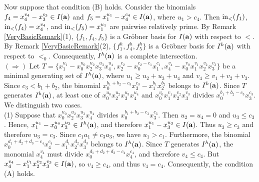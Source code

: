 \documentclass[10pt]{amsart}
\begin{document}
Now suppose that condition (B) holds. Consider the binomials $f_{4}=x_{4}^{v_4}-x_{3}^{c_3} \in I({\bf a})$ and $f_{5}=x_{1}^{u_1}-x_{4}^{c_4} \in I({\bf a})$, where $u_1>c_4$. Then ${\rm in}_{<}(f_{1})$, ${\rm in}_{<}(f_{4})=x_{4}^{v_4}$, and ${\rm in}_{<}(f_{5})=x_{1}^{u_1}$ are pairwise relatively prime. By Remark \ref{VeryBasicRemark}(1), $\{f_1, f_4, f_5\}$ is a Gr\"obner basis for $I({\bf a})$ with respect to $<$. By Remark \ref{VeryBasicRemark}(2), $\{f_1^h, f_4^h, f_5^h\}$ is a Gr\"obner basis for $I^{h}({\bf a})$ with respect to $<_{0}$. Consequently, $I^{h}({\bf a})$ is a complete intersection.\\
$(\Rightarrow)$ Let $T=\{x_{1}^{u_1}-x_{0}^{u_0}x_{2}^{u_2}x_{3}^{u_3}x_{4}^{u_4}, x_{2}^{c_2}-x_{0}^{c_2-c_1}x_{1}^{c_1}, x_{4}^{v_4}-x_{0}^{v_0}x_{1}^{v_1}x_{2}^{v_2}x_{3}^{v_3}\}$ be a minimal generating set of $I^{h}({\bf a})$, where $u_{1} \geq u_2+u_3+u_4$ and $v_{4} \geq v_1+v_2+v_3$. Since $c_{3}<b_{1}+b_{2}$, the binomial $x_{0}^{b_{1}+b_{2}-c_{3}}x_{3}^{c_3}-x_{1}^{b_1}x_{2}^{b_2}$ belongs to $I^{h}({\bf a})$. Since $T$ generates $I^{h}({\bf a})$, at least one of $x_{0}^{u_0}x_{2}^{u_2}x_{3}^{u_3}x_{4}^{u_4}$ and $x_{0}^{v_0}x_{1}^{v_1}x_{2}^{v_2}x_{3}^{v_3}$ divides $x_{0}^{b_{1}+b_{2}-c_{3}}x_{3}^{c_3}$. We distinguish two cases.\\
(1) Suppose that $x_{0}^{u_0}x_{2}^{u_2}x_{3}^{u_3}x_{4}^{u_4}$ divides $x_{0}^{b_{1}+b_{2}-c_{3}}x_{3}^{c_3}$. Then $u_{2}=u_{4}=0$ and $u_{3} \leq c_{3}$. Hence, $x_{1}^{u_1}-x_{0}^{u_0}x_{3}^{u_3} \in I^{h}({\bf a})$, and therefore $x_{1}^{u_1}-x_{3}^{u_3} \in I({\bf a})$. Thus $u_{3} \geq c_{3}$ and therefore $u_{3}=c_{3}$. Since $c_1a_1 \neq c_3a_3$, we have $u_1>c_1$. Furthermore, the binomial $x_{0}^{d_1+d_2+d_3-c_4}x_{4}^{c_4}-x_{1}^{d_1}x_2^{d_2}x_3^{d_3}$ belongs to $I^{h}({\bf a})$. Since $T$ generates $I^{h}({\bf a})$, the monomial $x_4^{v_4}$ must divide $x_{0}^{d_1+d_2+d_3-c_4}x_{4}^{c_4}$, and therefore $v_4 \leq c_4$. But $x_{4}^{v_4}-x_{1}^{v_1}x_{2}^{v_2}x_{3}^{v_3} \in I({\bf a})$, so $v_{4} \geq c_4$, and thus $v_4=c_4$. Consequently, the condition (A) holds.\\
\end{document}
